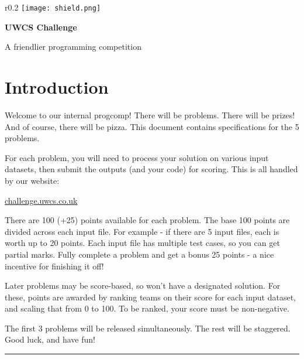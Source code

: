\documentclass[a4paper,11pt,parskip=half-]{scrartcl}
\begin{document}
\begin{wrapfigure}{r}{0.2\textwidth}
    \vspace{-10pt} %
    \texttt{[image: shield.png]}
    \vspace{-100pt} %
\end{wrapfigure}

{
    \Huge \bfseries UWCS Challenge
}

{
    \Large A friendlier programming competition
}

\section*{Introduction}

Welcome to our internal progcomp!
There will be problems. There will be prizes! And of course, there will be pizza.
This document contains specifications for the 5 problems.

For each problem, you will need to process your solution on various input datasets, then submit the outputs (and your code) for scoring.
This is all handled by our website:
\begin{center}
    \huge \href{https://challenge.uwcs.co.uk}{challenge.uwcs.co.uk}
\end{center}

There are 100 (+25) points available for each problem. 
The base 100 points are divided across each input file. 
For example - if there are 5 input files, each is worth up to 20 points. 
Each input file has multiple test cases, so you can get partial marks.
Fully complete a problem and get a bonus 25 points - a nice incentive for finishing it off!

Later problems may be score-based, so won't have a designated solution.
For these, points are awarded by ranking teams on their score for each input dataset, and scaling that from 0 to 100.
To be ranked, your score must be non-negative.

The first 3 problems will be released simultaneously.
The rest will be staggered. \\ 
Good luck, and have fun!

\vspace{16pt}
\hrule
\vspace{16pt}



\newpage


\newpage

\newpage

\newpage

\newpage

\end{document}
